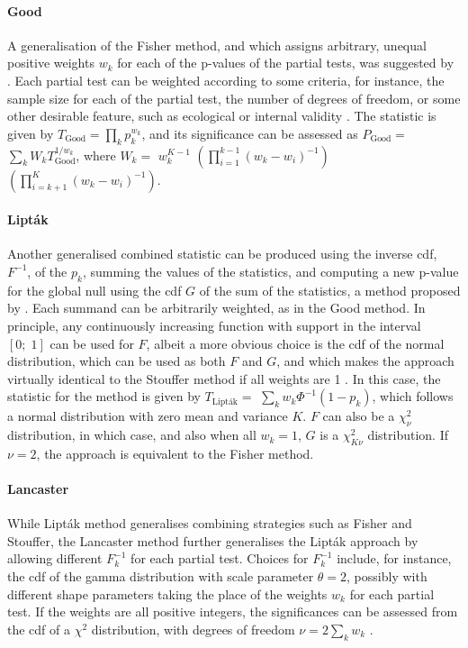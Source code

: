\paragraph{Good}  A generalisation of the Fisher method, and which assigns arbitrary, unequal positive weights $w_{k}$ for each of the p-values of the partial tests, was suggested by \citet{Good1955}. Each partial test can be weighted according to some criteria, for instance, the sample size for each of the partial test, the number of degrees of freedom, or some other desirable feature, such as ecological or internal validity \citep{Rosenthal1978}. The statistic is given by $T_{\text{Good}}=\prod_{k}p_{k}^{w_{k}}$, and its significance can be assessed as $P_{\text{Good}}=$ $\sum_{k}W_{k}T_{\text{Good}}^{1/w_{k}}$, where $W_{k}=$ $w_{k}^{K-1}$ $\left(\prod_{i=1}^{k-1}\left(w_{k}-w_{i}\right)^{-1}\right)$ $\left(\prod_{i=k+1}^{K}\left(w_{k}-w_{i}\right)^{-1}\right)$.

\paragraph{Lipt\'{a}k} Another generalised combined statistic can be produced using the inverse cdf, $F^{-1}$, of the $p_{k}$, summing the values of the statistics, and computing a new p-value for the global null using the cdf $G$ of the sum of the statistics, a method proposed by \citet{Liptak1958}. Each summand can be arbitrarily weighted, as in the Good method. In principle, any continuously increasing function with support in the interval $[0;\; 1]$ can be used for $F$, albeit a more obvious choice is the cdf of the normal distribution, which can be used as both $F$ and $G$, and which makes the approach virtually identical to the Stouffer method if all weights are 1 \citep{vanZwet1967}. In this case, the statistic for the method is given by $T_{\text{Lipt\'{a}k}} =$ $\sum_{k} w_{k}\Phi^{-1}\left(1-p_{k}\right)$, which follows a normal distribution with zero mean and variance $K$. $F$ can also be a $\chi^{2}_{\nu}$ distribution, in which case, and also when all $w_{k}=1$, $G$ is a $\chi^{2}_{K\nu}$ distribution. If $\nu=2$, the approach is equivalent to the Fisher method.

\paragraph{Lancaster} While Lipt\'{a}k method generalises combining strategies such as Fisher and Stouffer, the Lancaster method \citep{Lancaster1961} further generalises the Lipt\'{a}k approach by allowing different $F^{-1}_{k}$ for each partial test. Choices for $F^{-1}_{k}$ include, for instance, the cdf of the gamma distribution with scale parameter $\theta=2$, possibly with different shape parameters taking the place of the weights $w_{k}$ for each partial test. If the weights are all positive integers, the significances can be assessed from the cdf of a $\chi^{2}$ distribution, with degrees of freedom $\nu=2\sum_{k}w_{k}$ \citep{Berk1979}.

